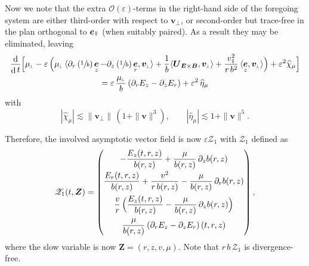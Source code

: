 \documentclass[JEP,XML,SOM,Unicode]{cedram}
\let\mathcal\mathscr
\newcommand{\sperp}{{\scriptscriptstyle\perp}}
\let\eps\varepsilon
\let\d\partial
\DeclareMathOperator\dD{d}\let\dd\dD
\theoremstyle{plain}
\theoremstyle{definition}
\newcommand\bp{\begin{pmatrix}}
\newcommand\ep{\end{pmatrix}}
\newcommand{\be}{\begin{equation}}
\newcommand{\ee}{\end{equation}}
\newcommand\bB{{\boldsymbol B}}
\newcommand\bE{{\boldsymbol E}}
\newcommand\bU{{\boldsymbol U}}
\newcommand\bfv{{\boldsymbol v}}
\newcommand\bfZ{{\boldsymbol Z}}
\newcommand\cO{{\mathcal O}}
\newcommand\cZ{{\mathcal Z}}
\DeclareMathOperator{\beD}{\boldsymbol{e}}
\newcommand\eDr{\beD_r}
\newcommand\eDz{\beD_z}
\newcommand\eDpar{\beD_\mypar}
\newcommand\vpar{v_\mypar}
\newcommand\bvperp{\bfv_{\!\sperp}}
\newcommand\muperp{\mu_{\!\sperp}}
\newcommand\Er{E_r}
\newcommand\Ez{E_z}
\newcommand{\EcB}{\bU_{\bE\times\bB}}
\newcommand{\mypar}{{\mkern3mu\vphantom{\perp}\vrule depth 0pt\mkern2mu\vrule depth 0pt\mkern3mu}}
\begin{document}
Now we note that the extra $\cO(\eps)$-terms in the right-hand side of the foregoing system are either third-order with respect to $\bvperp$, or second-order but trace-free in the plan orthogonal to $\eDpar$ (when suitably paired). As a result they may be eliminated, leaving
\begin{multline*}
\frac{\dD}{\dD t}\Bigl[\muperp
-\eps\,\Bigl(
\muperp\,\langle \d_r\left(\sfrac1b\right)\eDz-\d_z\left(\sfrac1b\right)\eDr,\bvperp\rangle
+\frac1b\langle\EcB,\bvperp\rangle
+\frac{\vpar^2}{r\,b^2}
\,\langle\eDz,\bvperp\rangle
\Bigr)+\eps^2\widehat\chi_\mu\Bigr]\\
=
\eps\,\frac{\muperp}{b}\left(\d_r\Ez-\d_z\Er\right) +\eps^2\,\widehat\eta_\mu
\end{multline*}
with
\be\label{mu-axi-remainders}
|\widehat\chi_\mu|\lesssim \|\bvperp\|\,(1+\|\bfv\|^3),\qquad
|\widehat\eta_\mu|\lesssim 1+\|\bfv\|^5.
\ee

Therefore, the involved asymptotic vector field is now $\eps\cZ_1$ with $\cZ_1$ defined as
\[
\cZ_1(t,\bfZ)
=\bp
-\dfrac{\Ez(t,r,z)}{b(r,z)}+\dfrac{\mu}{b(r,z)}\,\d_zb(r,z)\\[8pt]
\dfrac{\Er(t,r,z)}{b(r,z)}+\dfrac{v^2}{r\,b(r,z)}
-\dfrac{\mu}{b(r,z)}\,\d_rb(r,z)
\\[10pt]
\dfrac{v}{r}\,\Bigl(\dfrac{\Ez(t,r,z)}{b(r,z)}
-\dfrac{\mu}{b(r,z)}\,\d_zb(r,z)\Bigr)\\[10pt]
\dfrac{\mu}{b(r,z)}\left(\d_r\Ez-\d_z\Er\right)(t,r,z)
\ep,
\]
where the slow variable is now $\bfZ=(r,z,v,\mu)$. Note that $r\,b\,\cZ_1$ is divergence-free.
\end{document}
